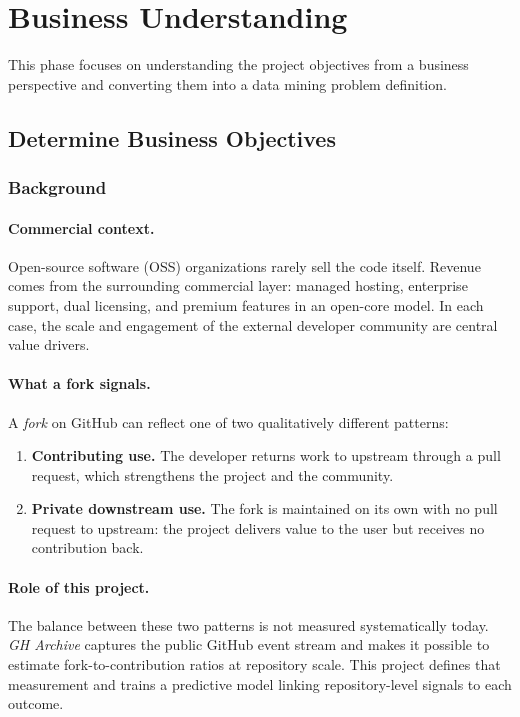 \section{Business Understanding}
This phase focuses on understanding the project objectives from a business perspective and converting them into a data mining problem definition.

\subsection{Determine Business Objectives}

\subsubsection{Background}

\paragraph{Commercial context.}
Open-source software (OSS) organizations rarely sell the code itself.
Revenue comes from the surrounding commercial layer: managed hosting, enterprise support, dual licensing, and premium features in an open-core model.
In each case, the scale and engagement of the external developer community are central value drivers.

\paragraph{What a fork signals.}
A \emph{fork} on GitHub can reflect one of two qualitatively different patterns:
\begin{enumerate}
  \item \textbf{Contributing use.}\quad
  The developer returns work to upstream through a pull request, which strengthens the project and the community.
  \item \textbf{Private downstream use.}\quad
  The fork is maintained on its own with no pull request to upstream: the project delivers value to the user but receives no contribution back.
\end{enumerate}

\paragraph{Role of this project.}
The balance between these two patterns is not measured systematically today.
\textit{GH Archive} captures the public GitHub event stream and makes it possible to estimate fork-to-contribution ratios at repository scale.
This project defines that measurement and trains a predictive model linking repository-level signals to each outcome.

